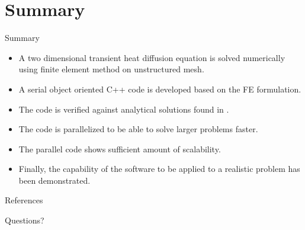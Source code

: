 \documentclass[t,english]{beamer}
\begin{document}
\section{Summary}

\begin{frame}{Summary}
\begin{itemize}
\item A two dimensional transient heat diffusion equation is solved numerically using finite element method on unstructured mesh. 
\item A serial object oriented C++ code is developed based on the FE formulation.
\item The code is verified against analytical solutions found in \cite{jw}. 
\item The code is parallelized to be able to solve larger problems faster. 
\item The parallel code shows sufficient amount of scalability. 
\item Finally, the capability of the software to be applied to a realistic problem has been demonstrated.
\end{itemize}
\end{frame}

\begin{frame}[c]{References}


\end{frame}

\begin{frame}[c]

\begin{center}
{\Large Questions?}
\end{center}

\end{frame}
\end{document}
